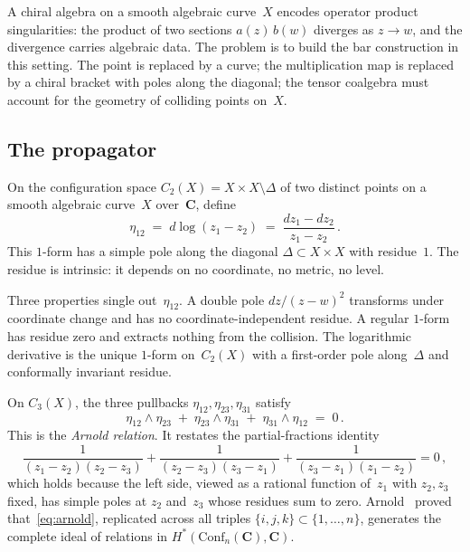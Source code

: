 \documentclass[11pt,reqno]{amsart}
\theoremstyle{definition}
\theoremstyle{remark}
\newcommand{\Conf}{\mathrm{Conf}}
\renewcommand{\Bbbk}{\mathbf{C}}
\numberwithin{equation}{section}
\begin{document}
A chiral algebra on a smooth algebraic curve~$X$ encodes
operator product singularities: the product of two sections
$a(z)\,b(w)$ diverges as $z \to w$, and the divergence carries
algebraic data. The problem is to build the bar construction in
this setting. The point is replaced by a curve; the
multiplication map is replaced by a chiral bracket with poles
along the diagonal; the tensor coalgebra must account for the
geometry of colliding points on~$X$.

\subsection{The propagator}
\label{ssec:propagator}

On the configuration space $C_2(X) = X \times X \setminus \Delta$
of two distinct points on a smooth algebraic curve~$X$
over~$\Bbbk$, define
\begin{equation}\label{eq:eta}
\eta_{12}
\;=\;
d\log(z_1 - z_2)
\;=\;
\frac{dz_1 - dz_2}{z_1 - z_2}\,.
\end{equation}
This $1$-form has a simple pole along the diagonal
$\Delta \subset X \times X$ with residue~$1$. The residue is
intrinsic: it depends on no coordinate, no metric, no level.

Three properties single out~$\eta_{12}$. A double pole
$dz/(z-w)^2$ transforms under coordinate change and has no
coordinate-independent residue. A regular $1$-form has
residue zero and extracts nothing from the collision. The
logarithmic derivative is the unique $1$-form on~$C_2(X)$
with a first-order pole along~$\Delta$ and conformally
invariant residue.

On $C_3(X)$, the three pullbacks
$\eta_{12}, \eta_{23}, \eta_{31}$ satisfy
\begin{equation}\label{eq:arnold}
\eta_{12} \wedge \eta_{23}
\;+\;
\eta_{23} \wedge \eta_{31}
\;+\;
\eta_{31} \wedge \eta_{12}
\;=\; 0\,.
\end{equation}
This is the \emph{Arnold relation}. It restates the
partial-fractions identity
\[
\frac{1}{(z_1 {-} z_2)(z_2 {-} z_3)}
+
\frac{1}{(z_2 {-} z_3)(z_3 {-} z_1)}
+
\frac{1}{(z_3 {-} z_1)(z_1 {-} z_2)}
= 0\,,
\]
which holds because the left side, viewed as a rational function
of~$z_1$ with $z_2, z_3$ fixed, has simple poles at $z_2$
and~$z_3$ whose residues sum to zero.
Arnold~\cite{Arnold69} proved that~\eqref{eq:arnold}, replicated
across all triples $\{i,j,k\} \subset \{1,\ldots,n\}$, generates
the complete ideal of relations in
$H^*(\Conf_n(\Bbbk), \Bbbk)$.
\end{document}

